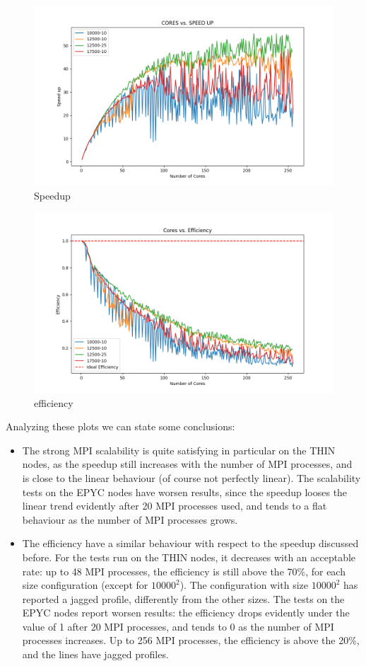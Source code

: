 \documentclass[12pt, titlepage]{report}
\begin{document}
\begin{figure}[H]
	\centering
	\includegraphics[width=\textwidth]{Assignment-1/cores_vs_speedUp_2.png}
	\caption{Speedup}
\end{figure}
\begin{figure}[H]
	\centering
	\includegraphics[width=\textwidth]{Assignment-1/cores_vs_efficiency_2.png}
	\caption{efficiency}
\end{figure}


Analyzing these plots we can state some conclusions:
\begin{itemize}
	\item The strong MPI scalability is quite satisfying in particular on the THIN nodes, as the speedup still increases
	with the number of MPI processes, and is close to the linear behaviour (of course not perfectly linear). The scalability tests on the EPYC nodes
	have worsen results, since the speedup looses the linear trend evidently after 20 MPI processes used, and tends to a flat behaviour as the number of 
	MPI processes grows.
	\item The eﬀiciency have a similar behaviour with respect to the speedup discussed before. For the tests run on the THIN nodes, 
	it decreases with an acceptable rate: up to 48 MPI processes, the eﬀiciency is still above the 70\%, for each size configuration (except for $10000^2$).
	The configuration with size $10000^2$ has reported a jagged profile, differently from the other sizes. The tests on the EPYC nodes report worsen results:
	the efficiency drops evidently under the value of 1 after 20 MPI processes, and tends to 0 as the number of MPI processes increases.
	Up to 256 MPI processes, the eﬀiciency is above the 20\%, and the lines have jagged profiles.
\end{itemize}
\end{document}
